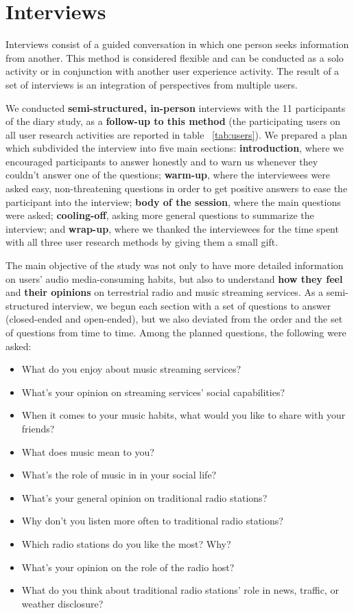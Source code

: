 \section{Interviews}

Interviews consist of a guided conversation in which one person seeks information from another. This method is considered flexible and can be conducted as a solo activity or in conjunction with another user experience activity. The result of a set of interviews is an integration of perspectives from multiple users. ~\cite{Courage2005}

We conducted \textbf{semi-structured, in-person} interviews with the 11 participants of the diary study, as a \textbf{follow-up to this method} (the participating users on all user research activities are reported in table ~\ref{tab:users}). We prepared a plan which subdivided the interview into five main sections: \textbf{introduction}, where we encouraged participants to answer honestly and to warn us whenever they couldn't answer one of the questions; \textbf{warm-up}, where the interviewees were asked easy, non-threatening questions in order to get positive answers to ease the participant into the interview; \textbf{body of the session}, where the main questions were asked; \textbf{cooling-off}, asking more general questions to summarize the interview; and \textbf{wrap-up}, where we thanked the interviewees for the time spent with all three user research methods by giving them a small gift.

The main objective of the study was not only to have more detailed information on users' audio media-consuming habits, but also to understand \textbf{how they feel} and \textbf{their opinions} on terrestrial radio and music streaming services. As a semi-structured interview, we begun each section with a set of questions to answer (closed-ended and open-ended), but we also deviated from the order and the set of questions from time to time. Among the planned questions, the following were asked:

\begin{itemize}
  \item What do you enjoy about music streaming services?
  \item What’s your opinion on streaming services’ social capabilities?
  \item When it comes to your music habits, what would you like to share with your friends?
  \item What does music mean to you?
  \item What’s the role of music in in your social life?
  \item What’s your general opinion on traditional radio stations?
  \item Why don’t you listen more often to traditional radio stations?
  \item Which radio stations do you like the most? Why?
  \item What’s your opinion on the role of the radio host?
  \item What do you think about traditional radio stations’ role in news, traffic, or weather disclosure?
\end{itemize}


